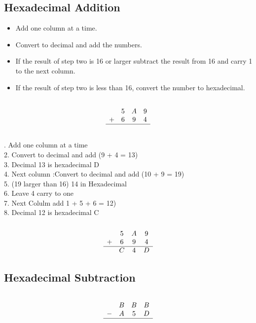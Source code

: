 \documentclass[a4paper,12pt]{article}
\begin{document}
\subsection*{Hexadecimal Addition}
\begin{itemize}
\item		Add one column at a time.

\item		Convert to decimal and add the numbers.

\item	If the result of step two is 16 or larger subtract the result from 16 and carry 1 to the next column.

\item	If the result of step two is less than 16, convert the number to hexadecimal.

\end{itemize}
\[\begin{array}{cccc}
	&		&		&		\\	
	&	5	&	A	&	9	\\	
	+&	6	&	9	&	4	\\	\hline
	&		&		&		\\	
\end{array} \]

. Add one column at a time\\
2. Convert to decimal and add (9 + 4 = 13)\\
3. Decimal 13 is hexadecimal D\\
4. Next column :Convert to decimal and add (10 + 9 = 19)\\
5. (19 larger than 16) 14 in Hexadecimal \\
6. Leave 4 carry to one\\
7.  Next Colulm add 1 + 5 + 6 = 12)\\
8. Decimal 12 is hexadecimal C\\

\[\begin{array}{cccc}
	&		&		&		\\	
	&	5	&	A	&	9	\\	
	+&	6	&	9	&	4	\\	\hline
	&	C	&	4	&	D	\\	
\end{array} \]

\subsection*{Hexadecimal Subtraction}
\[\begin{array}{cccc}
	&		&		&		\\	
	&	B	&	B	&	B	\\	
	-&	A	&	5	&	D	\\	\hline
	&		&		&		\\	
\end{array} \]
\end{document}
